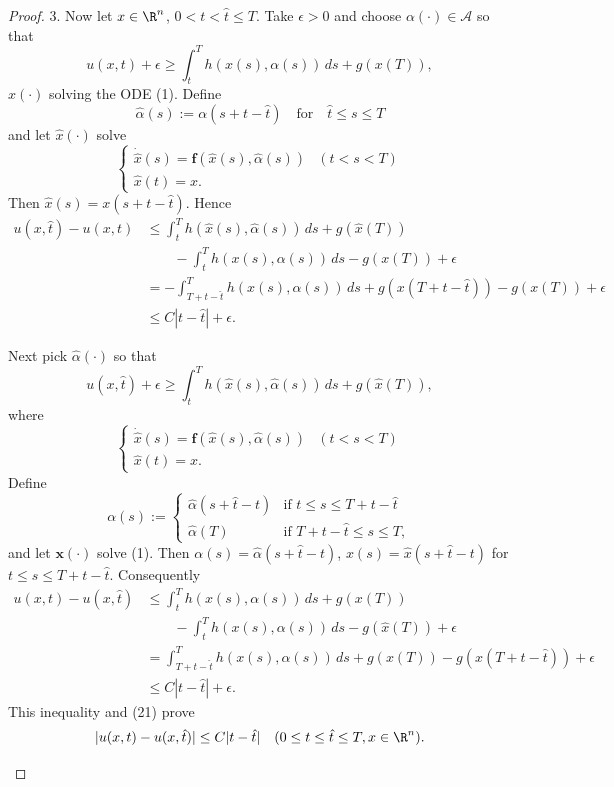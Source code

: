 \begin{proof}
3. Now let $x \in \R^n$, $0 < t < \hat{t} \leq T$. Take $\epsilon > 0$ and choose $\alpha(\cdot) \in \mathcal{A}$ so that
\[
u(x, t) + \epsilon \geq \int_t^T h(x(s), \alpha(s)) \, ds + g(x(T)),
\]
$x(\cdot)$ solving the ODE (1). Define
\[
\hat{\alpha}(s) := \alpha(s + t - \hat{t}) \quad \text{for} \quad \hat{t} \leq s \leq T
\]
and let $\hat{x}(\cdot)$ solve
\[
\begin{cases}
\dot{\hat{x}}(s) = \mathbf{f}(\hat{x}(s), \hat{\alpha}(s)) & (t < s < T) \\
\hat{x}(t) = x.
\end{cases}
\]
Then $\hat{x}(s) = x(s + t - \hat{t})$. Hence
\[
\begin{aligned}
u(x, \hat{t}) - u(x, t) &\leq \int_t^T h(\hat{x}(s), \hat{\alpha}(s))\,ds + g(\hat{x}(T)) \\
&\qquad - \int_t^T h(x(s), \alpha(s))\,ds - g(x(T)) + \epsilon \\
&= - \int_{T+t-\hat{t}}^T h(x(s), \alpha(s))\,ds + g(x(T + t - \hat{t})) - g(x(T)) + \epsilon \\
&\leq C|t - \hat{t}| + \epsilon.
\end{aligned}
\tag{21}
\]

Next pick $\hat{\alpha}(\cdot)$ so that
\[
u(x, \hat{t}) + \epsilon \geq \int_t^T h(\hat{x}(s), \hat{\alpha}(s))\,ds + g(\hat{x}(T)),
\]
where
\[
\begin{cases}
\dot{\hat{x}}(s) = \mathbf{f}(\hat{x}(s), \hat{\alpha}(s)) & (t < s < T) \\
\hat{x}(t) = x.
\end{cases}
\]
Define
\[
\alpha(s) := \begin{cases}
\hat{\alpha}(s + \hat{t} - t) & \text{if } t \leq s \leq T + t - \hat{t} \\
\hat{\alpha}(T) & \text{if } T + t - \hat{t} \leq s \leq T,
\end{cases}
\]
and let $\mathbf{x}(\cdot)$ solve (1). Then $\alpha(s) = \hat{\alpha}(s + \hat{t} - t)$, $x(s) = \hat{x}(s + \hat{t} - t)$ for $t \leq s \leq T + t - \hat{t}$. Consequently
\[
\begin{aligned}
u(x, t) - u(x, \hat{t}) &\leq \int_t^T h(x(s), \alpha(s))\,ds + g(x(T)) \\
&\qquad - \int_t^T h(x(s), \alpha(s))\,ds - g(\hat{x}(T)) + \epsilon \\
&= \int_{T+t-\hat{t}}^T h(x(s), \alpha(s))\,ds + g(x(T)) - g(x(T + t - \hat{t})) + \epsilon \\
&\leq C|t - \hat{t}| + \epsilon.
\end{aligned}
\]
This inequality and (21) prove
\[
|u(x, t) - u(x, \hat{t})| \leq C|t - \hat{t}| \quad (0 \leq t \leq \hat{t} \leq T, x \in \R^n).
\]

\begin{figure}[h]\centering
\end{figure}
\end{proof}

